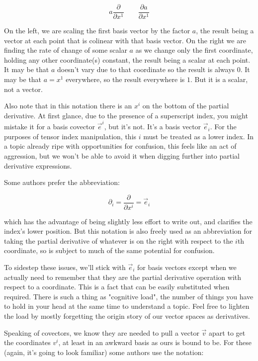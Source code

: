 $$
a \frac{\partial}{\partial x^1}
\quad \quad
\frac{\partial a}{\partial x^1} 
$$

On the left, we are scaling the first basis vector by the factor $a$, the result being a vector at each point that is colinear with that basis vector. On the right we are finding the rate of change of some scalar $a$ as we change only the first coordinate, holding any other coordinate(s) constant, the result being a scalar at each point. It may be that $a$ doesn't vary due to that coordinate so the result is always $0$. It may be that $a = x^1$ everywhere, so the result everywhere is $1$. But it is a scalar, not a vector.

Also note that in this notation there is an $x^i$ on the bottom of the partial derivative. At first glance, due to the presence of a superscript index, you might mistake it for a basis covector $\vec{e}^i$, but it's not. It's a basis vector $\vec{e}_i$. For the purposes of tensor index manipulation, this $i$ must be treated as a lower index. In a topic already ripe with opportunities for confusion, this feels like an act of aggression, but we won't be able to avoid it when digging further into partial derivative expressions.

Some authors prefer the abbreviation:

$$
\partial_i = \frac{\partial}{\partial x^i} = \vec{e}_i
$$

which has the advantage of being slightly less effort to write out, and clarifies the index's lower position. But this notation is also freely used as an abbreviation for taking the partial derivative of whatever is on the right with respect to the $i$th coordinate, so is subject to much of the same potential for confusion.

To sidestep these issues, we'll stick with $\vec{e}_i$ for basis vectors except when we actually need to remember that they are the partial derivative operation with respect to a coordinate. This is a fact that can be easily substituted when required. There is such a thing as "cognitive load", the number of things you have to hold in your head at the same time to understand a topic. Feel free to lighten the load by mostly forgetting the origin story of our vector spaces as derivatives.

Speaking of covectors, we know they are needed to pull a vector $\vec{v}$ apart to get the coordinates $v^i$, at least in an awkward basis as ours is bound to be. For these (again, it's going to look familiar) some authors use the notation:

